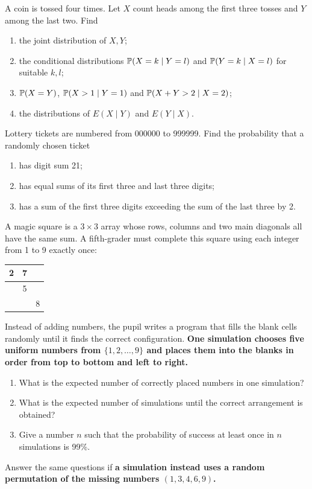 \documentclass[a4paper]{report}
\begin{document}
\begin{problembook}
A coin is tossed four times. Let $X$ count heads among the first three tosses and $Y$ among the last two. Find
\begin{enumerate}
\item the joint distribution of $X,Y$;
\item the conditional distributions $\P(X=k\mid Y=l)$ and $\P(Y=k\mid X=l)$ for suitable $k,l$;
\item $\P(X=Y)$, $\P(X>1\mid Y=1)$ and $\P(X+Y>2\mid X=2)$;
\item the distributions of $E(X\mid Y)$ and $E(Y\mid X)$.
\end{enumerate}
\end{problembook}
\begin{problemstar}
Lottery tickets are numbered from 000000 to 999999. Find the probability that a randomly chosen ticket
\begin{enumerate}
\item has digit sum 21;
\item has equal sums of its first three and last three digits;
\item has a sum of the first three digits exceeding the sum of the last three by 2.
\end{enumerate}
\end{problemstar}
\begin{problempencil}
A magic square is a $3\times3$ array whose rows, columns and two main diagonals all have the same sum. A fifth-grader must complete this square using each integer from 1 to 9 exactly once:
\begin{center}\renewcommand{\arraystretch}{1.8}\begin{tabular}{|c|c|c|}\hline
2&7&\phantom{9}\\\hline
\phantom{9}&5&\phantom{9}\\\hline
\phantom{9}&\phantom{9}&8\\\hline
\end{tabular}\end{center}
Instead of adding numbers, the pupil writes a program that fills the blank cells randomly until it finds the correct configuration.
\textbf{One simulation chooses five uniform numbers from $\{1,2,\dots,9\}$ and places them into the blanks in order from top to bottom and left to right.}
\begin{enumerate}
\item What is the expected number of correctly placed numbers in one simulation?
\item What is the expected number of simulations until the correct arrangement is obtained?
\item Give a number $n$ such that the probability of success at least once in $n$ simulations is 99\%.
\end{enumerate}
Answer the same questions if \textbf{a simulation instead uses a random permutation of the missing numbers $(1,3,4,6,9)$.}
\end{problempencil}
\end{document}
